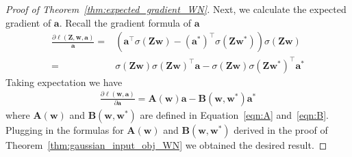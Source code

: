 \documentclass{article}
\newcommand{\firstlayer}{w}
\newcommand{\secondlayer}{a}
\newcommand{\mat}[1]{\mathbf{#1}}
\newcommand{\vect}[1]{\mathbf{#1}}
\newcommand{\relu}[1]{\sigma\left(#1\right)}
\begin{document}
\begin{proof}[Proof of Theorem~\ref{thm:expected_gradient_WN}]
Next, we calculate the expected gradient of $\vect{\secondlayer}$.
Recall the gradient formula of $\vect{\secondlayer}$\begin{align*}
\frac{\partial \ell(\mat{Z},\vect{\firstlayer},\vect{\secondlayer})}{\vect{\secondlayer}} = &\left(\vect{\secondlayer}^\top\relu{\mat{Z}\vect{\firstlayer}}-(\vect{\secondlayer}^*)^\top\relu{\mat{Z}\vect{\firstlayer}^*}\right)\relu{\mat{Z}\vect{\firstlayer}} \\
= & \relu{\mat{Z}\vect{\firstlayer}}\relu{\mat{Z}\vect{\firstlayer}}^\top\vect{\secondlayer} - \relu{\mat{Z}\vect{\firstlayer}}\relu{\mat{Z}\vect{\firstlayer}^*}^\top\vect{\secondlayer}^*
\end{align*}
Taking expectation we have
\begin{align*}
\frac{\partial \ell\left(\vect{\firstlayer},\vect{\secondlayer}\right)}{\partial \vect{\secondlayer}} =  \mat{A}\left(\vect{\firstlayer}\right)\vect{\secondlayer} - \mat{B}\left(\vect{\firstlayer},\vect{\firstlayer}^*\right)\vect{\secondlayer}^*
\end{align*}
where $\mat{A}\left(\vect{\firstlayer}\right)$ and $\mat{B}\left(\vect{\firstlayer},\vect{\firstlayer}^*\right)$ are defined in Equation~\eqref{eqn:A} and~\eqref{eqn:B}.
Plugging in the formulas for $\mat{A}\left(\vect{\firstlayer}\right)$ and $\mat{B}\left(\vect{\firstlayer},\vect{\firstlayer}^*\right)$ derived in the proof of Theorem~\ref{thm:gaussian_input_obj_WN} we obtained the desired result.


\end{proof}
\end{document}

